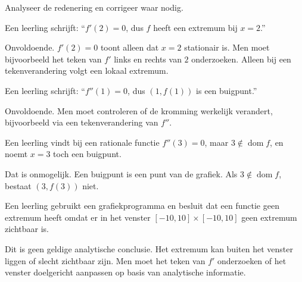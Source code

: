 \documentclass{ximera}
\begin{document}
\begin{oefening}[Foutenanalyse]{\oefU\ESS}
Analyseer de redenering en corrigeer waar nodig.

\begin{question}
Een leerling schrijft:
``\(f'(2)=0\), dus \(f\) heeft een extremum bij \(x=2\).''
\begin{oplossing}
Onvoldoende. \(f'(2)=0\) toont alleen dat \(x=2\) stationair is.
Men moet bijvoorbeeld het teken van \(f'\) links en rechts van \(2\)
onderzoeken. Alleen bij een tekenverandering volgt een lokaal extremum.
\end{oplossing}
\end{question}

\begin{question}
Een leerling schrijft:
``\(f''(1)=0\), dus \((1,f(1))\) is een buigpunt.''
\begin{oplossing}
Onvoldoende. Men moet controleren of de kromming werkelijk verandert,
bijvoorbeeld via een tekenverandering van \(f''\).
\end{oplossing}
\end{question}

\begin{question}
Een leerling vindt bij een rationale functie \(f''(3)=0\), maar
\(3\notin\operatorname{dom}f\), en noemt \(x=3\) toch een buigpunt.
\begin{oplossing}
Dat is onmogelijk. Een buigpunt is een punt van de grafiek. Als
\(3\notin\operatorname{dom}f\), bestaat \((3,f(3))\) niet.
\end{oplossing}
\end{question}

\begin{question}
Een leerling gebruikt een grafiekprogramma en besluit dat een functie
geen extremum heeft omdat er in het venster \([-10,10]\times[-10,10]\)
geen extremum zichtbaar is.
\begin{oplossing}
Dit is geen geldige analytische conclusie. Het extremum kan buiten het
venster liggen of slecht zichtbaar zijn. Men moet het teken van \(f'\)
onderzoeken of het venster doelgericht aanpassen op basis van analytische
informatie.
\end{oplossing}
\end{question}
\end{oefening}
\end{document}
